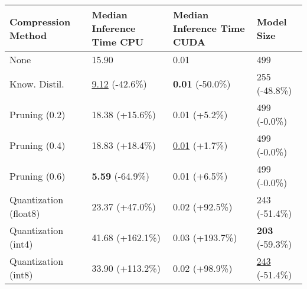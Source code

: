 \begin{tabular}{llll}
\toprule
\textbf{Compression Method} & \textbf{Median Inference Time CPU} & \textbf{Median Inference Time CUDA} & \textbf{Model Size} \\
\midrule
None & 15.90 & 0.01 & 499 \\
Know. Distil. & \underline{9.12} (-42.6\%) & \textbf{0.01} (-50.0\%) & 255 (-48.8\%) \\
Pruning (0.2) & 18.38 (+15.6\%) & 0.01 (+5.2\%) & 499 (-0.0\%) \\
Pruning (0.4) & 18.83 (+18.4\%) & \underline{0.01} (+1.7\%) & 499 (-0.0\%) \\
Pruning (0.6) & \textbf{5.59} (-64.9\%) & 0.01 (+6.5\%) & 499 (-0.0\%) \\
Quantization (float8) & 23.37 (+47.0\%) & 0.02 (+92.5\%) & 243 (-51.4\%) \\
Quantization (int4) & 41.68 (+162.1\%) & 0.03 (+193.7\%) & \textbf{203} (-59.3\%) \\
Quantization (int8) & 33.90 (+113.2\%) & 0.02 (+98.9\%) & \underline{243} (-51.4\%) \\
\bottomrule
\end{tabular}
